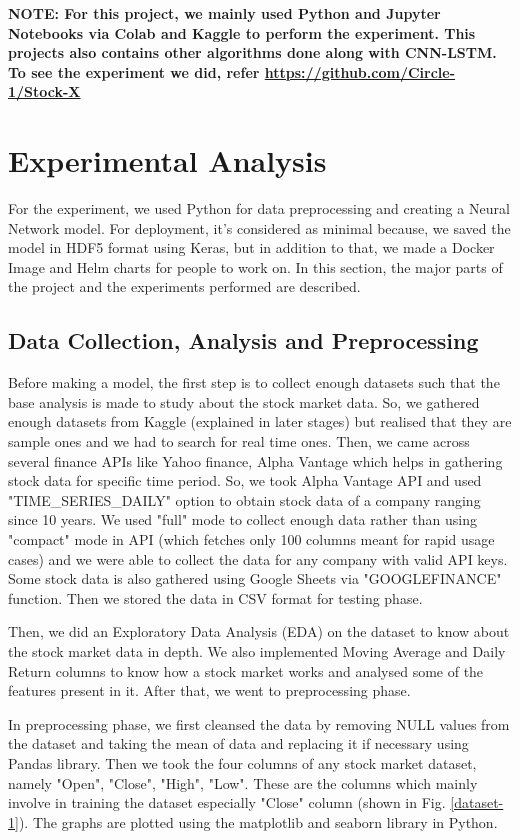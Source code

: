 \documentclass[conference]{IEEEtran}
\begin{document}
\textbf{NOTE: For this project, we mainly used Python and Jupyter Notebooks via Colab and Kaggle to perform the experiment. This projects also contains other algorithms done along with CNN-LSTM. To see the experiment we did, refer \url{https://github.com/Circle-1/Stock-X}}

\section{Experimental Analysis}
For the experiment, we used Python for data preprocessing and creating a Neural Network model. For deployment, it's considered as minimal because, we saved the model in HDF5 format using Keras, but in addition to that, we made a Docker Image and Helm charts for people to work on. In this section, the major parts of the project and the experiments performed are described.

\subsection{Data Collection, Analysis and Preprocessing}\label{A}
Before making a model, the first step is to collect enough datasets such that the base analysis is made to study about the stock market data. So, we gathered enough datasets from Kaggle (explained in later stages) but realised that they are sample ones and we had to search for real time ones. Then, we came across several finance APIs like Yahoo finance, Alpha Vantage which helps in gathering stock data for specific time period. So, we took Alpha Vantage API and used "TIME\_SERIES\_DAILY" option to obtain stock data of a company ranging since 10 years. We used "full" mode to collect enough data rather than using "compact" mode in API (which fetches only 100 columns meant for rapid usage cases) and we were able to collect the data for any company with valid API keys. Some stock data is also gathered using Google Sheets via "GOOGLEFINANCE" function. Then we stored the data in CSV format for testing phase.

Then, we did an Exploratory Data Analysis (EDA) on the dataset to know about the stock market data in depth. We also implemented Moving Average and Daily Return columns to know how a stock market works and analysed some of the features present in it. After that, we went to preprocessing phase.

In preprocessing phase, we first cleansed the data by removing NULL values from the dataset and taking the mean of data and replacing it if necessary using Pandas library. Then we took the four columns of any stock market dataset, namely "Open", "Close", "High", "Low". These are the columns which mainly involve in training the dataset especially "Close" column (shown in Fig. \ref{dataset-1}). The graphs are plotted using the matplotlib and seaborn library in Python. 
\end{document}
